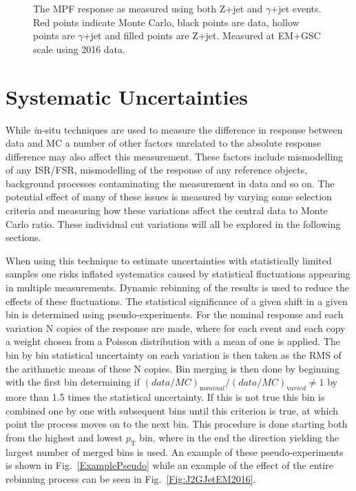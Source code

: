 \begin{figure}[!ht]
\begin{center}
\end{center}
\caption[Comparing EM scale response between Z+jet and $\gamma$+jet]
{\small The MPF response as measured using both Z+jet and $\gamma$+jet events.  Red points indicate Monte Carlo, black points are data, hollow points are $\gamma$+jet and filled points are Z+jet.  Measured at EM+GSC scale using 2016 data.   }
\label{GammaZCompare2016EM}
\end{figure}


\section{Systematic Uncertainties}

While {\textit in-situ} techniques are used to measure the difference in response between data and MC a number of other factors unrelated to the absolute response difference may also affect this measurement.  
These factors include mismodelling of any ISR/FSR, mismodelling of the response of any reference objects, background processes contaminating the measurement in data and so on.  
The potential effect of many of these issues is measured by varying some selection criteria and measuring how these variations affect the central data to Monte Carlo ratio.  
These individual cut variations will all be explored in the following sections.  

When using this technique to estimate uncertainties with statistically limited samples one risks inflated systematics caused by statistical fluctuations appearing in multiple measurements.  
Dynamic rebinning of the results is used to reduce the effects of these fluctuations.  
The statistical significance of a given shift in a given bin is determined using pseudo-experiments.  
For the nominal response and each variation N copies of the response are made, where for each event and each copy a weight chosen from a Poisson distribution with a mean of one is applied.  
The bin by bin statistical uncertainty on each variation is then taken as the RMS of the arithmetic means of these N copies.  
Bin merging is then done by beginning with the first bin determining if $\left(data/MC\right)_{\mathrm nominal}/\left(data/MC\right)_{\mathrm varied}\neq1$ by more than 1.5 times the statistical uncertainty.  
If this is not true this bin is combined one by one with subsequent bins until this criterion is true, at which point the process moves on to the next bin.  
This procedure is done starting both from the highest and lowest $p_{\mathrm T}$ bin, where in the end the direction yielding the largest number of merged bins is used.  
An example of these pseudo-experiments is shown in Fig.~\ref{ExamplePseudo} while an example of the effect of the entire rebinning process can be seen in Fig.~\ref{Fig:J2GJetEM2016}.  %

